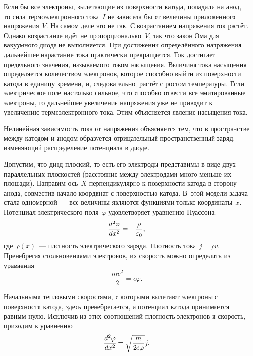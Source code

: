 Если бы все электроны, вылетающие из поверхности катода, попадали на анод, то
сила термоэлектронного тока~$I$ не
зависела бы от величины приложенного напряжения~$V$. На самом деле это не так. С
возрастанием напряжения ток растёт.
Однако возрастание идёт не пропорционально~$V$, так что закон Ома для вакуумного
диода не выполняется. При достижении определённого напряжения дальнейшее
нарастание тока практически прекращается. Ток достигает предельного значения,
называемого током насыщения. Величина тока насыщения определяется количеством
электронов, которое способно выйти из поверхности катода в единицу времени, и,
следовательно, растёт с ростом температуры. Если электрическое поле настолько
сильное, что способно отвести все эмитированные электроны, то дальнейшее
увеличение напряжения уже не приводит к увеличению термоэлектронного тока. Этим
объясняется явление насыщения тока.

Нелинейная зависимость тока от напряжения объясняется тем, что в пространстве
между катодом и анодом образуется
отрицательный пространственный заряд, изменяющий распределение потенциала в
диоде.

Допустим, что диод плоский, то есть его электроды представимы в виде двух
параллельных плоскостей (расстояние между
электродами много меньше их площади). Направим ось~$X$ перпендикулярно к
поверхности катода в сторону анода, совместив начало координат с поверхностью
катода. В~этой модели задача стала одномерной~--- все величины являются
функциями только координаты~$x$. Потенциал электрического поля~$\varphi$
удовлетворяет уравнению Пуассона:
\begin{equation}
	\eqmark{3.14}
	\frac{d^2\varphi}{dx^2}=-\frac{\rho}{\varepsilon_0},
\end{equation}
где~$\rho(x)$~--- плотность электрического заряда. Плотность тока~$j=\rho v$.
Пренебрегая столкновениями электронов, их скорость можно определить из уравнения
\begin{equation*}
	\frac{mv^2}{2}=e\varphi.
\end{equation*}

Начальными тепловыми скоростями, с которыми вылетают электроны с поверхности
катода, здесь пренебрегается, а потенциал катода принимается равным нулю.
Исключив из этих соотношений плотность электронов и скорость, приходим к
уравнению
\begin{equation}
	\eqmark{3.15}
	\frac{d^2\varphi}{dx^2}=\sqrt{\frac{m}{2e\varphi}} j.
\end{equation}

